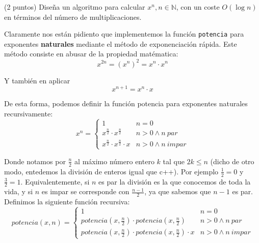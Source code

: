 \documentclass[12pt]{article}
\begin{document}
    \begin{ejercicio}
        (2 puntos) Diseña 
        un algoritmo para calcular 
        $x^{n},   n \in \mathbb{N}$, 
        con un coste $O(\log{n})$ en términos del
        número de multiplicaciones.

        Claramente nos están pidiento que implementemos la función 
        \verb|potencia| para exponentes \textbf{naturales} 
        mediante el método de exponenciación rápida. Este método 
        consiste en abusar de la propiedad matématica:
        \begin{equation*}
            x^{2n} = (x^{n})^{2} = x^{n} \cdot x^{n}
        \end{equation*}

        Y también en aplicar 
        \begin{equation*}
            x^{n+1} = x^{n} \cdot x
        \end{equation*}

        De esta forma, podemos definir la función potencia para 
        exponentes naturales recursivamente:
        \begin{equation*}
            x^{n} = \left \{ \begin{array}{lcc} 
                1 & n = 0  \\ 
                x^{\frac{n}{2}} \cdot x^{\frac{n}{2}}  & n > 0 \wedge n\: par \\
                x^{\frac{n}{2}} \cdot x^{\frac{n}{2}} \cdot x  & n > 0 \wedge n\: impar
            \end{array} \right .
        \end{equation*}

        Donde notamos por $\frac{n}{2}$ al máximo número entero $k$
        tal que $2k \leq n$ (dicho de otro modo, entedemos la división 
        de enteros igual que c++). Por ejemplo $\frac{1}{2} = 0$
        y $\frac{3}{2} = 1$. Equivalentemente, si $n$ es par 
        la división es la que conocemos de toda la vida, y si 
        $n$ es impar se corresponde con $\frac{n-1}{2}$, ya que sabemos
        que $n-1$ es par.\\
        Definimos la siguiente función recursiva:
        \begin{equation*}
            potencia(x,n) = \left \{ \begin{array}{lcc} 
                1 & n = 0  \\ 
                potencia(x,\frac{n}{2}) \cdot potencia(x,\frac{n}{2})  & n > 0 \wedge n\: par \\
                potencia(x,\frac{n}{2}) \cdot potencia(x,\frac{n}{2}) \cdot x  & n > 0 \wedge n\: impar
            \end{array} \right .
        \end{equation*}


\end{ejercicio}
\end{document}

